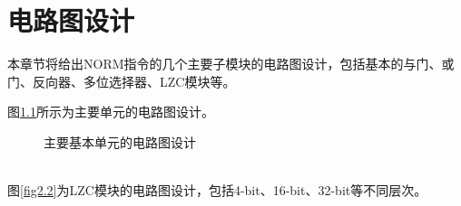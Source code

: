 \chapter{电路图设计}
本章节将给出NORM指令的几个主要子模块的电路图设计，包括基本的与门、或门、反向器、多位选择器、LZC模块等。

图\ref{fig2.1}所示为主要单元的电路图设计。
\begin{figure}[!hbtp]
\centering
{}



\caption{主要基本单元的电路图设计}
\label{fig2.1}
\end{figure}\\
图\ref{fig2.2}为LZC模块的电路图设计，包括4-bit、16-bit、32-bit等不同层次。
